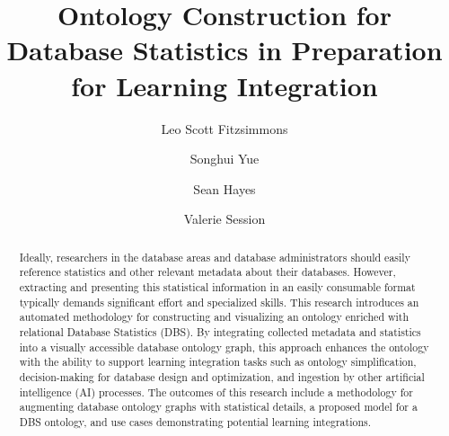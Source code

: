 \documentclass[sigconf]{acmart}
\begin{document}
\title{Ontology Construction for Database Statistics in Preparation for Learning Integration}

\author{Leo Scott Fitzsimmons}

\author{Songhui Yue}

\author{Sean Hayes}
	
\author{Valerie Session}


\renewcommand{\shortauthors}{Trovato et al.}

\begin{abstract}
Ideally, researchers in the database areas and database administrators should easily reference statistics and other relevant metadata about their databases. However, extracting and presenting this statistical information in an easily consumable format typically demands significant effort and specialized skills. This research introduces an automated methodology for constructing and visualizing an ontology enriched with relational Database Statistics (DBS). By integrating collected metadata and statistics into a visually accessible database ontology graph, this approach enhances the ontology with the ability to support learning integration tasks such as ontology simplification, decision-making for database design and optimization, and ingestion by other artificial intelligence (AI) processes. The outcomes of this research include a methodology for augmenting database ontology graphs with statistical details, a proposed model for a DBS ontology, and use cases demonstrating potential learning integrations.
\end{abstract}
\end{document}
